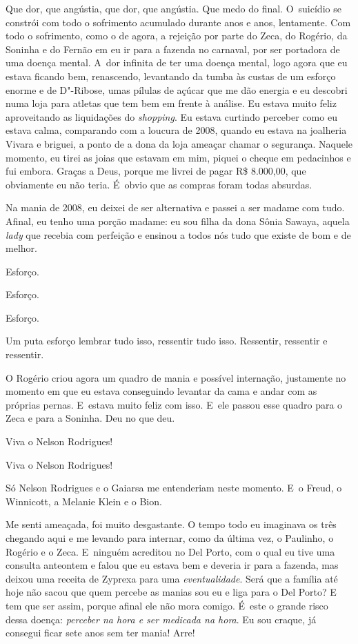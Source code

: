 Que dor, que angústia, que dor, que angústia. Que medo do final. O~suicídio se constrói com todo o sofrimento acumulado durante anos e
anos, lentamente. Com todo o sofrimento, como o de agora, a rejeição por
parte do Zeca, do Rogério, da Soninha e do Fernão em eu ir para a
fazenda no carnaval, por ser portadora de uma doença mental. A~dor
infinita de ter uma doença mental, logo agora que eu estava ficando bem,
renascendo, levantando da tumba às custas de um esforço enorme e de
D"-Ribose, umas pílulas de açúcar que me dão energia e eu descobri numa
loja para atletas que tem bem em frente à análise. Eu estava muito feliz
aproveitando as liquidações do \emph{shopping}. Eu estava curtindo
perceber como eu estava calma, comparando com a loucura de 2008, quando
eu estava na joalheria Vivara e briguei, a ponto de a dona da loja
ameaçar chamar o segurança. Naquele momento, eu tirei as joias que
estavam em mim, piquei o cheque em pedacinhos e fui embora. Graças a
Deus, porque me livrei de pagar R\$ 8.000,00, que obviamente eu não
teria. É~obvio que as compras foram todas absurdas.

Na mania de 2008, eu deixei de ser alternativa e passei a ser madame com
tudo. Afinal, eu tenho uma porção madame: eu sou filha da dona Sônia
Sawaya, aquela \emph{lady} que recebia com perfeição e ensinou a todos
nós tudo que existe de bom e de melhor.

Esforço.

Esforço.

Esforço.

Um puta esforço lembrar tudo isso, ressentir tudo isso. Ressentir,
ressentir e ressentir.

O Rogério criou agora um quadro de mania e possível internação,
justamente no momento em que eu estava conseguindo levantar da cama e
andar com as próprias pernas. E~estava muito feliz com isso. E~ele
passou esse quadro para o Zeca e para a Soninha. Deu no que deu.

Viva o Nelson Rodrigues!

Viva o Nelson Rodrigues!

Só Nelson Rodrigues e o Gaiarsa me entenderiam neste momento. E~o Freud,
o Winnicott, a Melanie Klein e o Bion.

Me senti ameaçada, foi muito desgastante. O tempo todo eu imaginava os
três chegando aqui e me levando para internar, como da última vez, o
Paulinho, o Rogério e o Zeca. E~ninguém acreditou no Del Porto, com o
qual eu tive uma consulta anteontem e falou que eu estava bem e deveria
ir para a fazenda, mas deixou uma receita de Zyprexa para uma
\emph{eventualidade}. Será que a família até hoje não sacou que quem
percebe as manias sou eu e liga para o Del Porto? E tem que ser assim,
porque afinal ele não mora comigo. É~este o grande risco dessa doença:
\emph{perceber na hora e ser medicada na hora}. Eu sou craque, já
consegui ficar sete anos sem ter mania! Arre!

